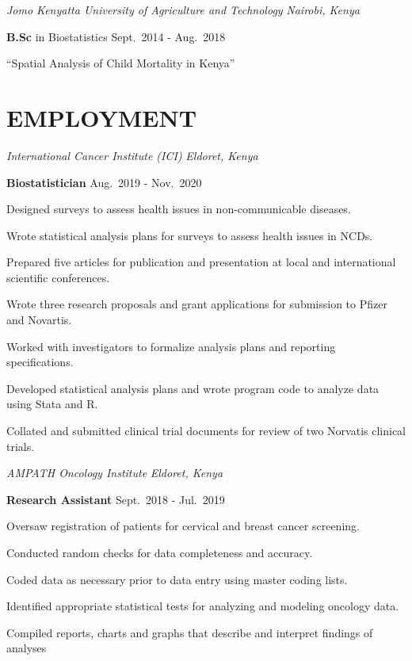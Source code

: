 \documentclass[13pt,]{article}
\providecommand{\tightlist}{%
  \setlength{\itemsep}{0pt}\setlength{\parskip}{0pt}}
\renewenvironment{itemize}{
  \begin{list}{}{
    \setlength{\leftmargin}{1.5em}
  }
}{
  \end{list}
}
\begin{document}
\emph{Jomo Kenyatta University of Agriculture and Technology}
\hfill \emph{Nairobi, Kenya}

\begin{itemize}
\item
  \textbf{B.Sc} in Biostatistics \hfill Sept.~2014 - Aug.~2018

  \begin{itemize}
  \tightlist
  \item
    ``Spatial Analysis of Child Mortality in Kenya''
  \end{itemize}
\end{itemize}

\hypertarget{employment}{%
\section{\texorpdfstring{\textbf{EMPLOYMENT}}{EMPLOYMENT}}\label{employment}}

\emph{International Cancer Institute (ICI)} \hfill \emph{Eldoret, Kenya}

\textbf{Biostatistician} \hfill Aug.~2019 - Nov.~2020

\begin{itemize}
\tightlist
\item
  Designed surveys to assess health issues in non-communicable diseases.
\item
  Wrote statistical analysis plans for surveys to assess health issues
  in NCDs.
\item
  Prepared five articles for publication and presentation at local and
  international scientific conferences.
\item
  Wrote three research proposals and grant applications for submission
  to Pfizer and Novartis.
\item
  Worked with investigators to formalize analysis plans and reporting
  specifications.
\item
  Developed statistical analysis plans and wrote program code to analyze
  data using Stata and R.
\item
  Collated and submitted clinical trial documents for review of two
  Norvatis clinical trials.
\end{itemize}

\emph{AMPATH Oncology Institute} \hfill \emph{Eldoret, Kenya}

\textbf{Research Assistant} \hfill Sept.~2018 - Jul.~2019

\begin{itemize}
\tightlist
\item
  Oversaw registration of patients for cervical and breast cancer
  screening.
\item
  Conducted random checks for data completeness and accuracy.
\item
  Coded data as necessary prior to data entry using master coding lists.
\item
  Identified appropriate statistical tests for analyzing and modeling
  oncology data.
\item
  Compiled reports, charts and graphs that describe and interpret
  findings of analyses
\end{itemize}
\end{document}
